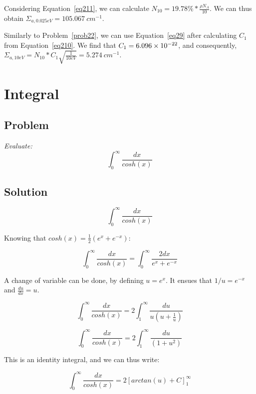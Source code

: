Considering Equation~\ref{eq211}, we can calculate $N_{10} = 19.78\% * \frac{\rho N_A}{10}$. We can thus obtain $\Sigma_{a, 0.025 eV} = 105.067\ cm^{-1}$.

Similarly to Problem~\ref{prob22}, we can use Equation~\ref{eq29} after calculating $C_1$ from Equation~\ref{eq210}. We find that $C_1 = \text{\num{6.096e-22}}$, and consequently, $\Sigma_{a, 10 eV} = N_{10} * C_1 \sqrt{\frac{1}{10 eV}} = 5.274\ cm^{-1}$.


\section{Integral}
\label{prob24}

\subsection{Problem}
\textit{Evaluate:
$$\int_0^{\infty} \frac{dx}{cosh(x)}$$}

\subsection{Solution}

\begin{equation}\label{eq213}
\int_0^{\infty} \frac{dx}{cosh(x)}
\end{equation}

Knowing that $cosh(x) = \frac{1}{2}(e^x + e^{-x})$:

\begin{equation}\label{eq214}
\int_0^{\infty} \frac{dx}{cosh(x)} = \int_0^{\infty} \frac{2dx}{e^x + e^{-x}}
\end{equation}

A change of variable can be done, by defining $u = e^x$. It ensues that $1/u = e^{-x}$ and $\frac{du}{dx} = u$.

\begin{equation}\label{eq215}
\int_0^{\infty} \frac{dx}{cosh(x)} = 2\int_1^{\infty} \frac{du}{ u ( u + \frac{1}{u} ) }
\end{equation}


\begin{equation}\label{eq216}
\int_0^{\infty} \frac{dx}{cosh(x)} = 2\int_1^{\infty} \frac{du}{(1 + u^2)}
\end{equation}

This is an identity integral, and we can thus write:


\begin{equation}\label{eq217}
\int_0^{\infty} \frac{dx}{cosh(x)} = 2\left[ arctan(u) + C\right]_1^{\infty}
\end{equation}

